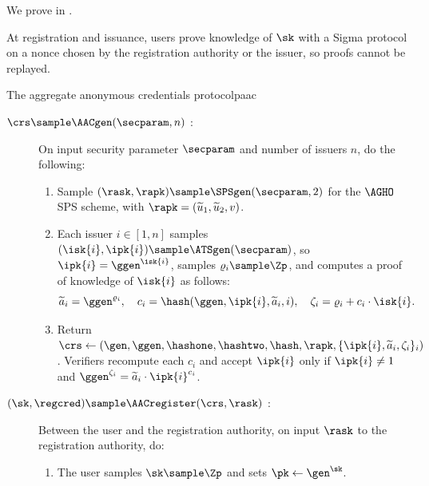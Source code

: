 We prove  in .

At registration and issuance, users prove knowledge of $\sk$ with a Sigma
protocol on a nonce chosen by the registration authority or the issuer, so proofs
cannot be replayed.


\begin{protocolbox}{The aggregate anonymous credentials protocol}{paac}

  \begin{description}

    \item[$\crs \sample \AACgen(\secparam, n)$ :] On input security parameter
$\secparam$ and number of issuers $n$, do the following:

      \begin{enumerate}

	\item Sample $(\rask,\rapk) \sample \SPSgen(\secparam,2)$ for the
$\AGHO$ SPS scheme, with $\rapk = (\widetilde{u}_1, \widetilde{u}_2, v)$.

	\item Each issuer $i \in [1,n]$ samples $(\isk{i},\ipk{i}) \sample
\ATSgen(\secparam)$, so $\ipk{i} = \ggen^{\isk{i}}$, samples $\varrho_i \sample
\Zp$, and computes a proof of knowledge of $\isk{i}$ as follows:
	  \begin{equation*}
	    \widetilde{a}_i = \ggen^{\varrho_i}, \quad c_i = \hash(\ggen, \ipk{i},
\widetilde{a}_i, i), \quad \zeta_i = \varrho_i + c_i \cdot \isk{i}.
	  \end{equation*}

	\item Return $\crs \leftarrow
(\gen,\ggen,\hashone,\hashtwo,\hash,\rapk,\{\ipk{i}, \widetilde{a}_i,
\zeta_i\}_i)$. Verifiers recompute each $c_i$ and accept $\ipk{i}$ only if
$\ipk{i} \neq 1$ and $\ggen^{\zeta_i} = \widetilde{a}_i \cdot \ipk{i}^{c_i}$.

      \end{enumerate}

    \item[$(\sk,\regcred) \sample \AACregister(\crs,\rask)$ :] Between the user
and the registration authority, on input $\rask$ to the registration authority, do:

      \begin{enumerate}

	\item The user samples $\sk \sample \Zp$ and sets $\pk \leftarrow
\gen^\sk$.


\end{enumerate}
\end{description}
\end{protocolbox}
